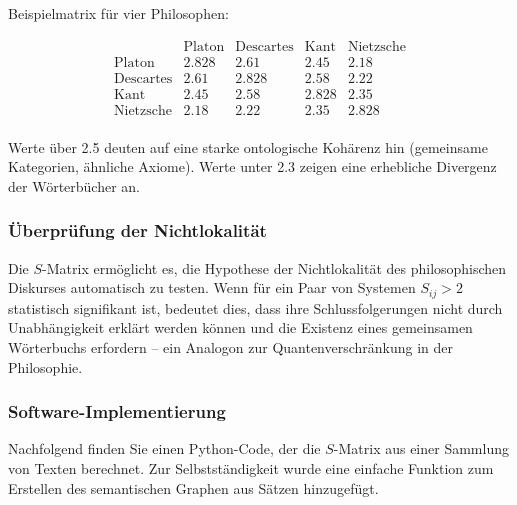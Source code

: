 \documentclass[12pt,a4paper]{article}
\begin{document}
	Beispielmatrix für vier Philosophen:
	
	\[
	\begin{array}{c|cccc}
		& \text{Platon} & \text{Descartes} & \text{Kant} & \text{Nietzsche} \\
		\hline
		\text{Platon} & 2.828 & 2.61 & 2.45 & 2.18 \\
		\text{Descartes} & 2.61 & 2.828 & 2.58 & 2.22 \\
		\text{Kant}   & 2.45 & 2.58 & 2.828 & 2.35 \\
		\text{Nietzsche}  & 2.18 & 2.22 & 2.35 & 2.828 \\
	\end{array}
	\]
	
	Werte über 2.5 deuten auf eine starke ontologische Kohärenz hin (gemeinsame Kategorien, ähnliche Axiome). Werte unter 2.3 zeigen eine erhebliche Divergenz der Wörterbücher an.
	
	\subsubsection{Überprüfung der Nichtlokalität}
	
	Die \(S\)-Matrix ermöglicht es, die Hypothese der Nichtlokalität des philosophischen Diskurses automatisch zu testen. Wenn für ein Paar von Systemen \(S_{ij} > 2\) statistisch signifikant ist, bedeutet dies, dass ihre Schlussfolgerungen nicht durch Unabhängigkeit erklärt werden können und die Existenz eines gemeinsamen Wörterbuchs erfordern – ein Analogon zur Quantenverschränkung in der Philosophie.
	
	\subsubsection{Software-Implementierung}
	
	Nachfolgend finden Sie einen Python-Code, der die \(S\)-Matrix aus einer Sammlung von Texten berechnet. Zur Selbstständigkeit wurde eine einfache Funktion zum Erstellen des semantischen Graphen aus Sätzen hinzugefügt.
	
\end{document}
